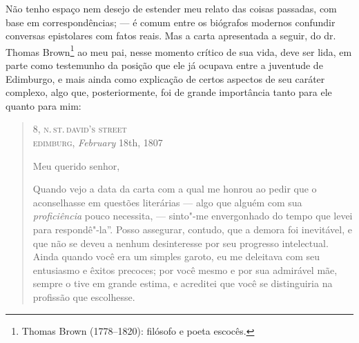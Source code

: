 Não tenho espaço nem desejo de estender meu relato das coisas
passadas, com base em correspondências; --- é comum entre os biógrafos
modernos confundir conversas epistolares com fatos reais. Mas a carta
apresentada a seguir, do dr.\,Thomas Brown\footnote{Thomas Brown
  (1778--1820): filósofo e poeta escocês.} ao meu pai, nesse
momento crítico de sua vida, deve ser lida, em parte como testemunho da
posição que ele já ocupava entre a juventude de Edimburgo, e mais ainda
como explicação de certos aspectos de seu caráter complexo, algo que,
posteriormente, foi de grande importância tanto para ele quanto para
mim: %

\begin{quote}
\begin{flushright}
8, \textsc{n.\,st.\,david's street}\\
\textsc{edimburg}, \textit{February} 18th, 1807
\end{flushright}

Meu querido senhor,

Quando vejo a data da carta com a qual me
honrou ao pedir que o aconselhasse em questões literárias --- algo que
alguém com sua \textit{proficiência} pouco necessita, --- sinto"-me
envergonhado do tempo que levei para respondê"-la''. Posso assegurar,
contudo, que a demora foi inevitável, e que não se deveu a nenhum
desinteresse por seu progresso intelectual. Ainda quando você era um
simples garoto, eu me deleitava com seu entusiasmo e êxitos precoces;
por você mesmo e por sua admirável mãe, sempre o tive em grande estima,
e acreditei que você se distinguiria na profissão que escolhesse.


\end{quote}
